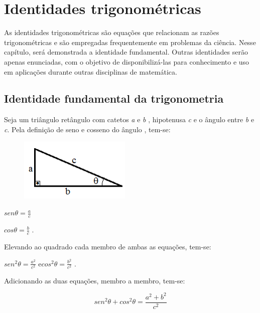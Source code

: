 \section{Identidades trigonométricas}

As identidades trigonométricas são equações que relacionam as razões trigonométricas e são empregadas frequentemente em problemas da ciência. Nesse capítulo, será demonstrada a identidade fundamental. Outras identidades serão apenas enunciadas, com o objetivo de disponibilizá-las para conhecimento e uso em aplicações durante outras disciplinas de matemática.

\subsection{Identidade fundamental da trigonometria}

Seja um triângulo retângulo com catetos \textit{a }e\textit{ b} , hipotenusa \textit{c }e o ângulo   entre \textit{b }e\textit{ c}.  Pela definição de seno e cosseno do ângulo  , tem-se:

\begin{multicols}{2}

\begin{figure}[H]
    \begin{Center}
        \includegraphics[width=2.09in,height=1.19in]{capitulos/trigonometria_e_funcoes_trigonometricas/media/image26.png}
    \end{Center}
\end{figure}

 \( sen \theta =\frac{a}{c} \) {     }

  \( cos \theta =\frac{b}{c} \) .

\end{multicols}
Elevando ao quadrado cada membro de ambas as equações, tem-se:

 \( sen^{2} \theta =\frac{a^{2}}{c^{2}} \)    \tab e\tab  \( cos^{2} \theta =\frac{b^{2}}{c^{2}} \)  .

Adicionando as duas equações, membro a membro, tem-se:

 \[ sen^{2} \theta  + cos^{2} \theta =\frac{a^{2}+b^{2}}{c^{2}} \]

